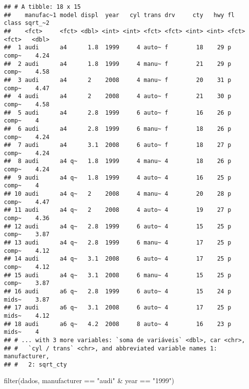 \documentclass[
]{book}
\newenvironment{Shaded}{\begin{snugshade}}{\end{snugshade}}
\newcommand{\FunctionTok}[1]{\textcolor[rgb]{0.00,0.00,0.00}{#1}}
\newcommand{\NormalTok}[1]{#1}
\newcommand{\SpecialCharTok}[1]{\textcolor[rgb]{0.00,0.00,0.00}{#1}}
\newcommand{\StringTok}[1]{\textcolor[rgb]{0.31,0.60,0.02}{#1}}
\begin{document}
\begin{verbatim}
## # A tibble: 18 x 15
##    manufac~1 model displ  year   cyl trans drv     cty   hwy fl    class sqrt_~2
##    <fct>     <fct> <dbl> <int> <int> <fct> <fct> <int> <int> <fct> <fct>   <dbl>
##  1 audi      a4      1.8  1999     4 auto~ f        18    29 p     comp~    4.24
##  2 audi      a4      1.8  1999     4 manu~ f        21    29 p     comp~    4.58
##  3 audi      a4      2    2008     4 manu~ f        20    31 p     comp~    4.47
##  4 audi      a4      2    2008     4 auto~ f        21    30 p     comp~    4.58
##  5 audi      a4      2.8  1999     6 auto~ f        16    26 p     comp~    4   
##  6 audi      a4      2.8  1999     6 manu~ f        18    26 p     comp~    4.24
##  7 audi      a4      3.1  2008     6 auto~ f        18    27 p     comp~    4.24
##  8 audi      a4 q~   1.8  1999     4 manu~ 4        18    26 p     comp~    4.24
##  9 audi      a4 q~   1.8  1999     4 auto~ 4        16    25 p     comp~    4   
## 10 audi      a4 q~   2    2008     4 manu~ 4        20    28 p     comp~    4.47
## 11 audi      a4 q~   2    2008     4 auto~ 4        19    27 p     comp~    4.36
## 12 audi      a4 q~   2.8  1999     6 auto~ 4        15    25 p     comp~    3.87
## 13 audi      a4 q~   2.8  1999     6 manu~ 4        17    25 p     comp~    4.12
## 14 audi      a4 q~   3.1  2008     6 auto~ 4        17    25 p     comp~    4.12
## 15 audi      a4 q~   3.1  2008     6 manu~ 4        15    25 p     comp~    3.87
## 16 audi      a6 q~   2.8  1999     6 auto~ 4        15    24 p     mids~    3.87
## 17 audi      a6 q~   3.1  2008     6 auto~ 4        17    25 p     mids~    4.12
## 18 audi      a6 q~   4.2  2008     8 auto~ 4        16    23 p     mids~    4   
## # ... with 3 more variables: `soma de variáveis` <dbl>, car <chr>,
## #   `cyl / trans` <chr>, and abbreviated variable names 1: manufacturer,
## #   2: sqrt_cty
\end{verbatim}

\begin{Shaded}
\begin{Highlighting}[]
\FunctionTok{filter}\NormalTok{(dados, manufacturer }\SpecialCharTok{==} \StringTok{"audi"} \SpecialCharTok{\&}\NormalTok{ year }\SpecialCharTok{==} \StringTok{"1999"}\NormalTok{) }
\end{Highlighting}
\end{Shaded}
\end{document}
